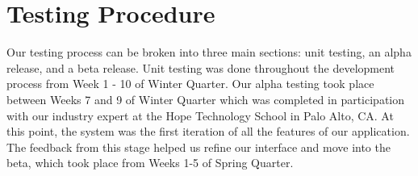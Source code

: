 \chapter{Testing Procedure}

Our testing process can be broken into three main sections: unit testing, an alpha release, and a beta release. Unit testing was done throughout the development process from Week 1 - 10 of Winter Quarter. Our alpha testing took place between Weeks 7 and 9 of Winter Quarter which was completed in participation with our industry expert at the Hope Technology School in Palo Alto, CA. At this point, the system was the first iteration of all the features of our application. The feedback from this stage helped us refine our interface and move into the beta, which took place from Weeks 1-5 of Spring Quarter.
